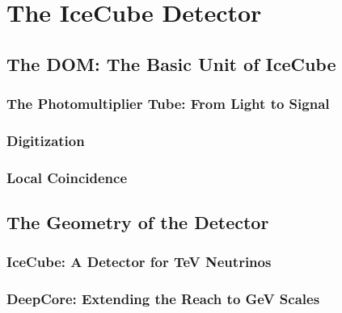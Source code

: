 \chapter{The IceCube Detector}
\label{sec:dom}
\section{The DOM: The Basic Unit of IceCube}

\label{subsec:pmt}
\subsection{The Photomultiplier Tube: From Light to Signal}

\label{subsec:digitization}
\subsection{Digitization}

\label{subsec:LC}
\subsection{Local Coincidence}

\label{sec:geometry}
\section{The Geometry of the Detector}

\label{subsec:icecube}
\subsection{IceCube: A Detector for TeV Neutrinos}

\label{subsec:deepcore}
\subsection{DeepCore: Extending the Reach to GeV Scales}
